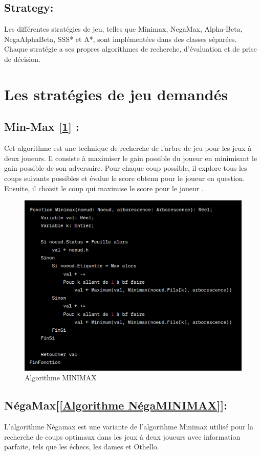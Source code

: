 \documentclass[12pt]{article}
\begin{document}
\subsection{Strategy:}Les différentes stratégies de jeu, telles que Minimax, NegaMax, Alpha-Beta, NegaAlphaBeta, SSS* et A*, sont implémentées dans des classes séparées. Chaque stratégie a ses propres algorithmes de recherche, d'évaluation et de prise de décision.


\section{Les stratégies de jeu demandés}
	    \subsection{Min-Max [\ref{Algorithme MINIMAX}] :} Cet algorithme est une technique de recherche de l'arbre de jeu pour les jeux à deux joueurs. Il consiste à maximiser le gain possible du joueur en minimisant le gain possible de son adversaire. Pour chaque coup possible, il explore tous les coups suivants possibles et évalue le score obtenu pour le joueur en question. Ensuite, il choisit le coup qui maximise le score pour le joueur .
	    
	    
	    
	    \begin{figure}[H]
	    	\centering
	    	\includegraphics[scale=0.55]{img/minimax}
	    	\caption{Algorithme MINIMAX }
	    	\label{Algorithme MINIMAX}
	    \end{figure}
	\subsection{NégaMax[\ref{Algorithme NégaMINIMAX}]:}L'algorithme Négamax est une variante de l'algorithme Minimax utilisé pour la recherche de coups optimaux dans les jeux à deux joueurs avec information parfaite, tels que les échecs, les dames et Othello.
	
\end{document}
